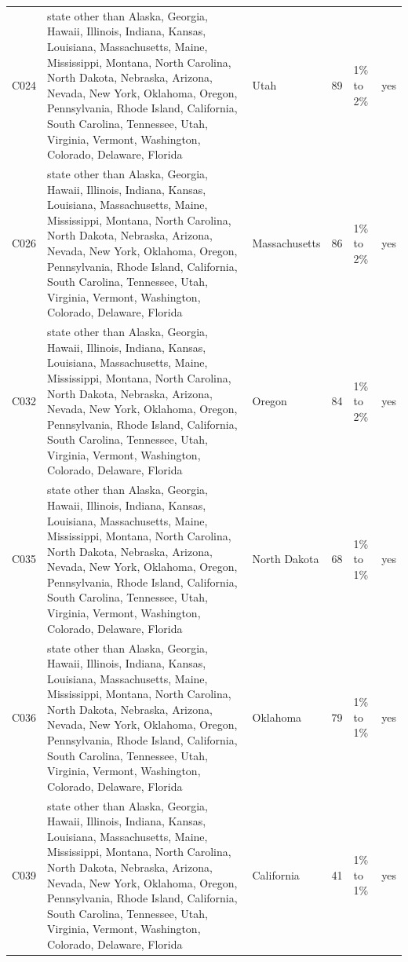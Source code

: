 \documentclass[a4paper,10pt]{article}
\newif\ifreviewmarks
\newcommand{\reviewrule}{\noindent{\color{BrickRed}\rule{\linewidth}{0.8pt}}}
\newenvironment{drafted}[1][]{%
  \ifreviewmarks\par\addvspace{\medskipamount}\reviewrule\par\nopagebreak
  \noindent{\color{BrickRed}\sffamily\footnotesize\textbf{Thesis Draft}\quad #1\hfill review}\par\nopagebreak\smallskip\fi}{%
  \ifreviewmarks\par\smallskip\noindent{\color{BrickRed}\sffamily\footnotesize end of thesis draft}\par\nopagebreak\reviewrule\par\medskip\fi}
\begin{document}
\begin{drafted}[plain-language layer: churn100-s4-c3]
{\begin{longtable}{@{}lllrlc@{}}
C024 & state other than Alaska, Georgia, Hawaii, Illinois, Indiana, Kansas, Louisiana, Massachusetts, Maine, Mississippi, Montana, North Carolina, North Dakota, Nebraska, Arizona, Nevada, New York, Oklahoma, Oregon, Pennsylvania, Rhode Island, California, South Carolina, Tennessee, Utah, Virginia, Vermont, Washington, Colorado, Delaware, Florida & Utah & 89 & 1\% to 2\% & \textcolor{OliveGreen}{yes} \\
C026 & state other than Alaska, Georgia, Hawaii, Illinois, Indiana, Kansas, Louisiana, Massachusetts, Maine, Mississippi, Montana, North Carolina, North Dakota, Nebraska, Arizona, Nevada, New York, Oklahoma, Oregon, Pennsylvania, Rhode Island, California, South Carolina, Tennessee, Utah, Virginia, Vermont, Washington, Colorado, Delaware, Florida & Massachusetts & 86 & 1\% to 2\% & \textcolor{OliveGreen}{yes} \\
C032 & state other than Alaska, Georgia, Hawaii, Illinois, Indiana, Kansas, Louisiana, Massachusetts, Maine, Mississippi, Montana, North Carolina, North Dakota, Nebraska, Arizona, Nevada, New York, Oklahoma, Oregon, Pennsylvania, Rhode Island, California, South Carolina, Tennessee, Utah, Virginia, Vermont, Washington, Colorado, Delaware, Florida & Oregon & 84 & 1\% to 2\% & \textcolor{OliveGreen}{yes} \\
C035 & state other than Alaska, Georgia, Hawaii, Illinois, Indiana, Kansas, Louisiana, Massachusetts, Maine, Mississippi, Montana, North Carolina, North Dakota, Nebraska, Arizona, Nevada, New York, Oklahoma, Oregon, Pennsylvania, Rhode Island, California, South Carolina, Tennessee, Utah, Virginia, Vermont, Washington, Colorado, Delaware, Florida & North Dakota & 68 & 1\% to 1\% & \textcolor{OliveGreen}{yes} \\
C036 & state other than Alaska, Georgia, Hawaii, Illinois, Indiana, Kansas, Louisiana, Massachusetts, Maine, Mississippi, Montana, North Carolina, North Dakota, Nebraska, Arizona, Nevada, New York, Oklahoma, Oregon, Pennsylvania, Rhode Island, California, South Carolina, Tennessee, Utah, Virginia, Vermont, Washington, Colorado, Delaware, Florida & Oklahoma & 79 & 1\% to 1\% & \textcolor{OliveGreen}{yes} \\
C039 & state other than Alaska, Georgia, Hawaii, Illinois, Indiana, Kansas, Louisiana, Massachusetts, Maine, Mississippi, Montana, North Carolina, North Dakota, Nebraska, Arizona, Nevada, New York, Oklahoma, Oregon, Pennsylvania, Rhode Island, California, South Carolina, Tennessee, Utah, Virginia, Vermont, Washington, Colorado, Delaware, Florida & California & 41 & 1\% to 1\% & \textcolor{OliveGreen}{yes} \\

\end{longtable}}
\end{drafted}
\end{document}
